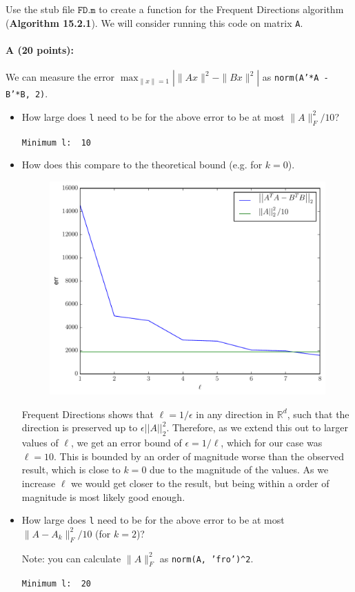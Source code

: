 \documentclass[11pt]{article}
\newcommand{\norm}[1]{\left|\left| #1 \right|\right|}
\begin{document}
Use the stub file $\texttt{FD.m}$ to create a function for the Frequent Directions algorithm (\textbf{Algorithm 15.2.1}).  We will consider running this code on matrix \texttt{A}.  

\paragraph{A (20 points):}
We can measure the error $\max_{\|x\|=1} | \|A x\|^2 - \|B x\|^2 |$ as 
\texttt{norm(A'*A - B'*B, 2)}.  
\begin{itemize} \denselist
\item How large does \texttt{l} need to be for the above error to be at most $\|A\|_F^2 /10$?  

\verb~Minimum l:  10~

\item How does this compare to the theoretical bound (e.g. for $k=0$).

\begin{figure}[H]
\centering
\includegraphics[width=.75\textwidth]{prob2a.pdf}
\end{figure}

Frequent Directions shows that $\ell = 1/\epsilon$ in any direction in $\mathbb{R}^{d}$, such that the direction is preserved up to $\epsilon \norm{A}^{2}_{2}$. Therefore, as we extend this out to larger values of $\ell$, we get an error bound of $\epsilon = 1/\ell$, which for our case was $\ell = 10$. This is bounded by an order of magnitude worse than the observed result, which is close to $k = 0$ due to the magnitude of the values. As we increase $\ell$ we would get closer to the result, but being within a order of magnitude is most likely good enough.
  
\item How large does \texttt{l} need to be for the above error to be at most $\|A - A_k\|_F^2/10$ (for $k=2$)?

Note: you can calculate $\|A\|_F^2$ as \texttt{norm(A, 'fro')\^{}2}.  


\verb~Minimum l:  20~

\end{itemize}
\end{document}
